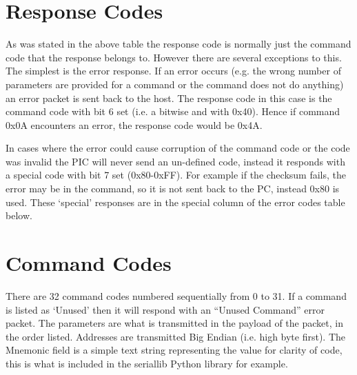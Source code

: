 \documentclass[a4paper,10pt]{book}
\begin{document}
\section{Response Codes}
As was stated in the above table the response code is normally just the command code that the response belongs to.  However there are several exceptions to this.  The simplest is the error response.  If an error occurs (e.g. the wrong number of parameters are provided for a command or the command does not do anything) an error packet is sent back to the host.  The response code in this case is the command code with bit 6 set (i.e. a bitwise and with 0x40).  Hence if command 0x0A encounters an error, the response code would be 0x4A.

In cases where the error could cause corruption of the command code or the code was invalid the PIC will never send an un-defined code, instead it responds with a special code with bit 7 set (0x80-0xFF).  For example if the checksum fails, the error may be in the command, so it is not sent back to the PC, instead 0x80 is used.  These `special' responses are in the special column of the error codes table below.

\section{Command Codes}
There are 32 command codes numbered sequentially from 0 to 31.  If a command is listed as `Unused' then it will respond with an ``Unused Command'' error packet.  The parameters are what is transmitted in the payload of the packet, in the order listed.  Addresses are transmitted Big Endian (i.e. high byte first).  The Mnemonic field is a simple text string representing the value for clarity of code, this is what is included in the seriallib Python library for example.
\end{document}
